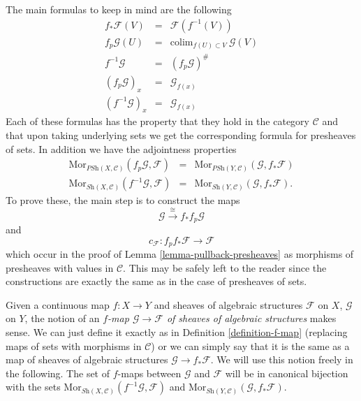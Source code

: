 \medskip\noindent
The main formulas to keep in mind are the following
\begin{eqnarray*}
f_*\mathcal{F}(V) & = & \mathcal{F}(f^{-1}(V)) \\
f_p\mathcal{G}(U) & = & \text{colim}_{f(U) \subset V}\ \mathcal{G}(V) \\
f^{-1}\mathcal{G} & = & (f_p\mathcal{G})^\# \\
(f_p\mathcal{G})_x & = & \mathcal{G}_{f(x)} \\
(f^{-1}\mathcal{G})_x & = & \mathcal{G}_{f(x)}
\end{eqnarray*}
Each of these formulas has the property that they hold in the
category $\mathcal{C}$ and that upon taking underlying
sets we get the corresponding formula for presheaves of sets.
In addition we have the adjointness properties
\begin{eqnarray*}
\text{Mor}_{\textit{PSh}(X, \mathcal{C})}(f_p\mathcal{G}, \mathcal{F})
& = &
\text{Mor}_{\textit{PSh}(Y, \mathcal{C})}(\mathcal{G}, f_*\mathcal{F}) \\
\text{Mor}_{\textit{Sh}(X, \mathcal{C})}(f^{-1}\mathcal{G}, \mathcal{F})
& = &
\text{Mor}_{\textit{Sh}(Y, \mathcal{C})}(\mathcal{G}, f_*\mathcal{F}).
\end{eqnarray*}
To prove these, the main step is to construct the maps
$$
\mathcal{G} \stackrel{\cong}{\longrightarrow} f_*f_p\mathcal{G}
$$
and
$$
c_{\mathcal{F}} : f_p f_* \mathcal{F} \longrightarrow \mathcal{F}
$$
which occur in the proof of Lemma \ref{lemma-pullback-presheaves} as
morphisms of presheaves with values in $\mathcal{C}$. This may be safely
left to the reader since the constructions are exactly the same
as in the case of presheaves of sets.

\medskip\noindent
Given a continuous map $f : X \to Y$ and sheaves of algebraic
structures $\mathcal{F}$ on $X$, $\mathcal{G}$ on $Y$, the notion
of an {\it $f$-map $\mathcal{G} \to \mathcal{F}$
of sheaves of algebraic structures} makes sense. We can just define
it exactly as in Definition \ref{definition-f-map} (replacing maps
of sets with morphisms in $\mathcal{C}$) or we can
simply say that it is the same as a map of sheaves of algebraic
structures $\mathcal{G} \to f_*\mathcal{F}$. We will use this
notion freely in the following. The set of $f$-maps between
$\mathcal{G}$ and $\mathcal{F}$ will be in canonical bijection
with the sets
$\text{Mor}_{\textit{Sh}(X, \mathcal{C})}(f^{-1}\mathcal{G}, \mathcal{F})$
and 
$\text{Mor}_{\textit{Sh}(Y, \mathcal{C})}(\mathcal{G}, f_*\mathcal{F})$.

